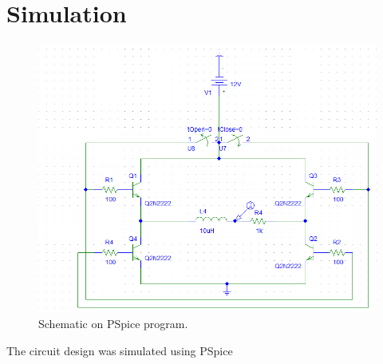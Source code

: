 \section{\textbf{Simulation}}\label{sec:3}

\begin{figure}[t]
    \includegraphics[height=.5\textwidth]{img/schem_pspice.png}
    \caption{Schematic on PSpice program.}\label{fig:schem_pspice}%
\end{figure}

    The circuit design was simulated using PSpice
